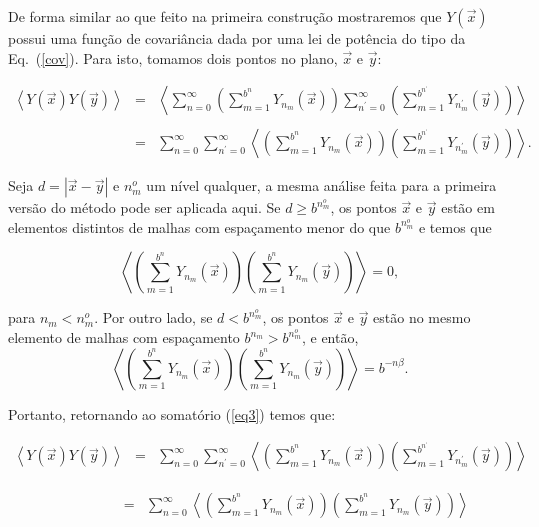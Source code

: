 \documentclass[12pt,a4paper,portuges]{article}
\newcommand{\Y}{{Y}}
\begin{document}
De forma similar ao que feito na primeira construção mostraremos que $\Y(\vec{x})$ possui uma
função de covariância dada por uma lei de potência do tipo da Eq.~(\ref{cov}).
Para isto, tomamos dois pontos no plano, $\vec{x}$ e $\vec{y}$:

\begin{equation}
	\begin{array}{rcl}
	\left\langle \Y(\vec{x}) \Y(\vec{y}) \right\rangle &=& \displaystyle\left\langle
	\sum^\infty_{n=0}
			\left( \sum^{b^n}_{m=1}
			{\Y}_{n_m}(\vec{x}) \right)
	\sum^\infty_{n^\prime=0}
			\left( \sum^{b^{n^\prime}}_{m=1}
			{\Y}_{n_m^{\prime}}(\vec{y}) \right)
	\right\rangle \\ \\
&=& \displaystyle\sum^\infty_{n=0}
	\sum^\infty_{n^\prime=0}
	\left\langle \left( \sum^{b^n}_{m=1} {\Y}_{n_m}(\vec{x}) \right)
	\left( \sum^{b^{n^\prime}}_{m=1} {\Y}_{n_m^{\prime}}(\vec{y}) \right) \right\rangle.
	\end{array}
\label{eq3}
\end{equation}

Seja $d=|\vec{x}-\vec{y}|$ e $n^{o}_{m}$ um nível qualquer, a mesma análise feita para a primeira
versão do método pode ser aplicada aqui. 
Se $d\ge b^{n_m^o}$, os pontos $\vec{x}$ e $\vec{y}$ estão em elementos distintos de malhas com
espaçamento menor do que $b^{n_m^o}$ e temos que
 
\[
\displaystyle \left\langle \left( \sum^{b^n}_{m=1} {\Y}_{n_m}(\vec{x}) \right) \left(
\sum^{b^{n}}_{m=1} {\Y}_{n_m}(\vec{y}) \right) \right\rangle = 0,
\]

\noindent para $n_m < n_m^o$.
Por outro lado, se $d<b^{n_m^o}$, os pontos $\vec{x}$ e $\vec{y}$ estão no mesmo elemento de
malhas
com espaçamento $b^{n_m}>b^{n_m^o}$, e então, 
\[
\displaystyle \left\langle \left( \sum^{b^n}_{m=1} {\Y}_{n_m}(\vec{x}) \right) \left(
\sum^{b^{n}}_{m=1} {\Y}_{n_m}(\vec{y}) \right) \right\rangle = b^{-n \beta}.
\]

\noindent Portanto, retornando ao somatório (\ref{eq3}) temos que:


\begin{eqnarray*}
	\left\langle \Y(\vec{x}) \Y(\vec{y}) \right\rangle 
	&=& \displaystyle
	\sum^\infty_{n=0}
	\sum^\infty_{n^\prime=0}
	\left\langle \left( \sum^{b^n}_{m=1} {\Y}_{n_m}(\vec{x}) \right)
	\left( \sum^{b^{n^\prime}}_{m=1}
	{\Y}_{n_m^{\prime}}(\vec{y}) \right) \right\rangle
\end{eqnarray*}


\begin{eqnarray*}
\qquad \qquad \ \ 	&=& \displaystyle
\sum^\infty_{n=0}\left\langle \left( \sum^{b^n}_{m=1} {\Y}_{n_m}(\vec{x})
	 \right) \left( \sum^{b^{n}}_{m=1}
	{\Y}_{n_m}(\vec{y}) \right) \right\rangle
\end{eqnarray*}
\end{document}
